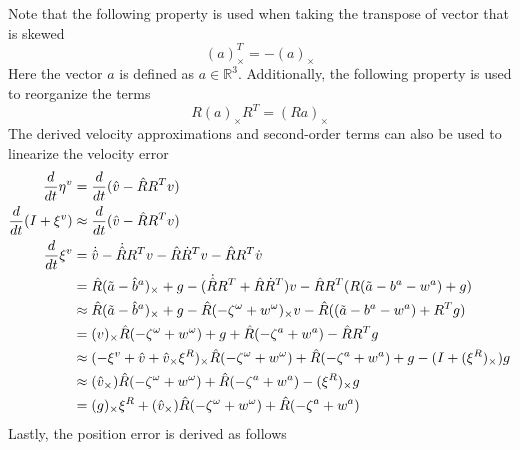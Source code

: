 Note that the following property is  used when taking the transpose of vector that is skewed
\begin{equation}
    (a)_{\times}^T = -(a)_{\times}
    \label{eq: transpose of skew}
\end{equation}
Here the vector $a$ is defined as $a \in \mathbb{R}^3$. Additionally, the following property is used to reorganize the terms
\begin{equation}
    R (a)_{\times} R^T = (R a)_{\times}
    \label{eq: RvR^T property}
\end{equation}
The derived velocity approximations and second-order terms can also be used to linearize the velocity error
\begin{equation}
    \begin{split}
        \frac{d}{dt} \eta^v &= \frac{d}{dt} (\hat{v} - \hat{R} R^T v) \\
        \frac{d}{dt} (I + \xi^v) &\approx \frac{d}{dt} (\hat{v} - \hat{R} R^T v) \\
        \frac{d}{dt} \xi^v &= \dot{\hat{v}} - \dot{\hat{R}}R^Tv - \hat{R} \dot{R}^T v - \hat{R} R^T \dot{v}\\
        &= \hat{R} (\Tilde{a} - \hat{b}^a)_{\times} + g -
            (\dot{\hat{R}}R^T + \hat{R} \dot{R}^T)v -
            \hat{R} R^T (R (\Tilde{a} - b^a - w^a) + g) \\
        &\approx \hat{R} (\Tilde{a} - \hat{b}^a)_{\times} + g -
            \hat{R} (-\zeta^{\omega} + w^{\omega})_{\times} v -
            \hat{R}((\Tilde{a} - b^a - w^a) + R^T g) \\
        &= (v)_{\times} \hat{R} (-\zeta^{\omega} + w^{\omega}) + g +
            \hat{R} (-\zeta^{a} + w^{a}) -
            \hat{R} R^T g \\
        &\approx  (-\xi^v + \hat{v} + \hat{v}_{\times} \xi^R)_{\times} \hat{R} (-\zeta^{\omega} + w^{\omega}) +
            \hat{R} (-\zeta^{a} + w^{a}) + g -
            (I + (\xi^R)_{\times})g \\
        &\approx (\hat{v}_{\times}) \hat{R} (-\zeta^{\omega} + w^{\omega}) +
            \hat{R} (-\zeta^{a} + w^{a}) -
            (\xi^R)_{\times} g \\
        &= (g)_{\times} \xi^R + 
            (\hat{v}_{\times}) \hat{R} (-\zeta^{\omega} + w^{\omega}) +
              \hat{R} (-\zeta^{a} + w^{a})
        \label{eq: v linearized RInEKF}
    \end{split}
\end{equation}
Lastly, the position error is derived as follows
